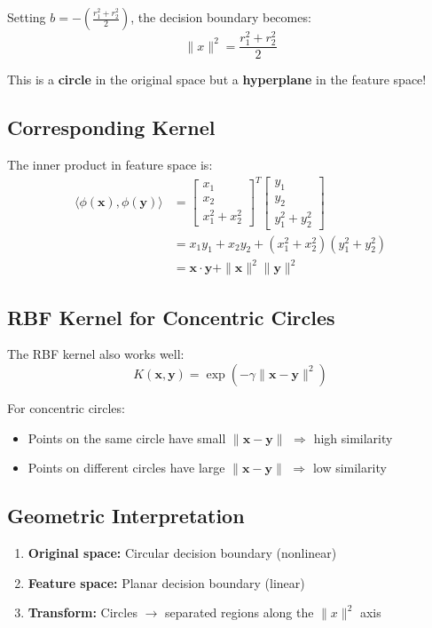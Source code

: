 \documentclass{tufte-handout}
\begin{document}
Setting $b = -\left(\frac{r_1^2 + r_2^2}{2}\right)$, the decision boundary becomes:
\[
\|x\|^2 = \frac{r_1^2 + r_2^2}{2}
\]

This is a \textbf{circle} in the original space but a \textbf{hyperplane} 
in the feature space!

\subsection{Corresponding Kernel}
The inner product in feature space is:
\begin{align}
\langle \phi(\mathbf{x}), \phi(\mathbf{y}) \rangle &= 
\begin{bmatrix} x_1 \\ x_2 \\ x_1^2 + x_2^2 \end{bmatrix}^T
\begin{bmatrix} y_1 \\ y_2 \\ y_1^2 + y_2^2 \end{bmatrix} \\
&= x_1 y_1 + x_2 y_2 + (x_1^2 + x_2^2)(y_1^2 + y_2^2) \\
&= \mathbf{x} \cdot \mathbf{y} + \|\mathbf{x}\|^2 \|\mathbf{y}\|^2
\end{align}

\subsection{RBF Kernel for Concentric Circles}
The RBF kernel also works well:
\[
K(\mathbf{x}, \mathbf{y}) = \exp\left(-\gamma \|\mathbf{x} - \mathbf{y}\|^2\right)
\]

For concentric circles:
\begin{itemize}
    \item Points on the same circle have small $\|\mathbf{x} - \mathbf{y}\|$ 
    $\Rightarrow$ high similarity
    \item Points on different circles have large $\|\mathbf{x} - \mathbf{y}\|$ 
    $\Rightarrow$ low similarity
\end{itemize}

\subsection{Geometric Interpretation}
\begin{enumerate}
    \item \textbf{Original space:} Circular decision boundary (nonlinear)
    \item \textbf{Feature space:} Planar decision boundary (linear)
    \item \textbf{Transform:} Circles $\to$ separated regions along the $\|x\|^2$ axis
\end{enumerate}
\end{document}
